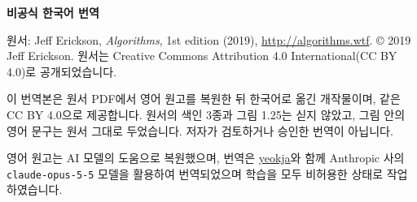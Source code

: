 \thispagestyle{empty}
\vspace*{\fill}
\noindent\textbf{비공식 한국어 번역}\par\medskip
\noindent 원서: Jeff Erickson, \textit{Algorithms}, 1st edition (2019), \url{http://algorithms.wtf}.
© 2019 Jeff Erickson. 원서는 Creative Commons Attribution 4.0 International(CC BY 4.0)로 공개되었습니다.\par\medskip
\noindent 이 번역본은 원서 PDF에서 영어 원고를 복원한 뒤 한국어로 옮긴 개작물이며, 같은 CC BY 4.0으로 제공합니다.
원서의 색인 3종과 그림 1.25는 싣지 않았고, 그림 안의 영어 문구는 원서 그대로 두었습니다.
저자가 검토하거나 승인한 번역이 아닙니다.\par\medskip
\noindent 영어 원고는 AI 모델의 도움으로 복원했으며, 번역은 \href{https://github.com/yeokja/yeokja}{yeokja}와 함께
Anthropic 사의 \texttt{claude-opus-5-5} 모델을 활용하여 번역되었으며 학습을 모두 비허용한 상태로 작업하였습니다.
\vspace*{\fill}
\clearpage
